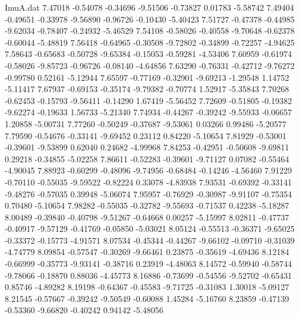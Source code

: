 \begin{filecontents}{ImuA.dat}
   7.47018   -0.54078   -0.34696   -9.51506   -0.73827    0.01783   -5.58742
   7.49404   -0.49651   -0.33978   -9.56890   -0.96726   -0.10430   -5.40423
   7.51727   -0.47378   -0.44985   -9.62034   -0.78407   -0.24932   -5.46529
   7.54108   -0.58026   -0.40558   -9.70648   -0.62378   -0.60044   -5.48819
   7.56418   -0.64965   -0.30508   -9.72802   -0.34899   -0.72257   -4.94625
   7.58643   -0.65683   -0.50728   -9.65384   -0.15053   -0.59281   -4.53406
   7.60959   -0.61974   -0.58026   -9.85723   -0.96726   -0.08140   -4.64856
   7.63290   -0.76331   -0.42712   -9.76272   -0.99780    0.52161   -5.12944
   7.65597   -0.77169   -0.32901   -9.69213   -1.29548    1.14752   -5.11417
   7.67937   -0.69153   -0.35174   -9.79382   -0.70774    1.52917   -5.35843
   7.70268   -0.62453   -0.15793   -9.56411   -0.14290    1.67419   -5.56452
   7.72609   -0.51805   -0.19382   -9.62274   -0.19633    1.56733   -5.21340
   7.74934   -0.44267   -0.39242   -9.55933   -0.06657    1.20858   -5.00731
   7.77260   -0.50249   -0.37687   -9.53061    0.03266    0.99486   -5.20577
   7.79590   -0.54676   -0.33141   -9.69452    0.23112    0.84220   -5.10654
   7.81929   -0.53001   -0.39601   -9.53899    0.62040    0.24682   -4.99968
   7.84253   -0.42951   -0.50608   -9.69811    0.29218   -0.34855   -5.02258
   7.86611   -0.52283   -0.39601   -9.71127    0.07082   -0.55464   -4.90045
   7.88923   -0.60299   -0.48096   -9.74956   -0.68484   -0.14246   -4.56460
   7.91229   -0.70110   -0.55035   -9.59522   -0.82224    0.33078   -4.83938
   7.93531   -0.69392   -0.33141   -9.48276   -0.57035    0.39948   -5.06074
   7.95957   -0.76929   -0.30987   -9.91107   -0.75354    0.70480   -5.10654
   7.98282   -0.55035   -0.32782   -9.55693   -0.71537    0.42238   -5.18287
   8.00489   -0.39840   -0.40798   -9.51267   -0.64668    0.00257   -5.15997
   8.02811   -0.47737   -0.40917   -9.57129   -0.41769   -0.05850   -5.03021
   8.05124   -0.55513   -0.36371   -9.65025   -0.33372   -0.15773   -4.91571
   8.07534   -0.45344   -0.44267   -9.66102   -0.09710   -0.31039   -4.74779
   8.09854   -0.57547   -0.30269   -9.66461    0.23875   -0.35619   -4.69436
   8.12184   -0.66999   -0.35773   -9.93141   -0.38716    0.23919   -4.48063
   8.14572   -0.59940   -0.58744   -9.78066   -0.18870    0.88036   -4.45773
   8.16886   -0.73699   -0.54556   -9.52702   -0.65431    0.85746   -4.89282
   8.19198   -0.64367   -0.45583   -9.71725   -0.31083    1.30018   -5.09127
   8.21545   -0.57667   -0.39242   -9.50549   -0.60088    1.45284   -5.16760
   8.23859   -0.47139   -0.53360   -9.66820   -0.40242    0.94142   -5.48056

\end{filecontents}
